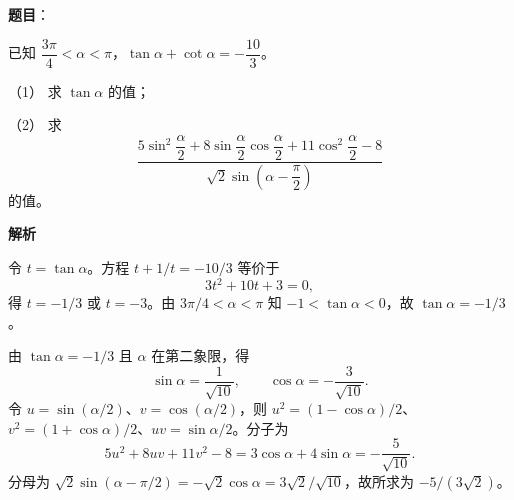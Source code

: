 \begin{answer}

\textbf{题目}：

已知 $\dfrac{3\pi}{4}<\alpha<\pi$，$\tan\alpha+\cot\alpha=-\dfrac{10}{3}$。

（1） 求 $\tan\alpha$ 的值；

（2） 求
\nopagebreak[4]
\[
\dfrac{5\sin^2\dfrac{\alpha}{2}+8\sin\dfrac{\alpha}{2}\cos\dfrac{\alpha}{2}+11\cos^2\dfrac{\alpha}{2}-8}{\sqrt{2}\sin\left(\alpha-\dfrac{\pi}{2}\right)}
\]
的值。

\textbf{解析}


令 $t=\tan\alpha$。方程 $t+1/t=-10/3$ 等价于
\nopagebreak[4]
\[
3t^2+10t+3=0,
\]
得 $t=-1/3$ 或 $t=-3$。由 $3\pi/4<\alpha<\pi$ 知 $-1<\tan\alpha<0$，故 $\tan\alpha=-1/3$。


由 $\tan\alpha=-1/3$ 且 $\alpha$ 在第二象限，得
\nopagebreak[4]
\[
\sin\alpha=\frac1{\sqrt{10}},\qquad \cos\alpha=-\frac3{\sqrt{10}}.
\]
令 $u=\sin(\alpha/2)$、$v=\cos(\alpha/2)$，则 $u^2=(1-\cos\alpha)/2$、$v^2=(1+\cos\alpha)/2$、$uv=\sin\alpha/2$。分子为
\nopagebreak[4]
\[
5u^2+8uv+11v^2-8=3\cos\alpha+4\sin\alpha=-\frac5{\sqrt{10}}.
\]
分母为 $\sqrt2\sin(\alpha-\pi/2)=-\sqrt2\cos\alpha=3\sqrt2/\sqrt{10}$，故所求为 $-5/(3\sqrt2)$。



\end{answer}
